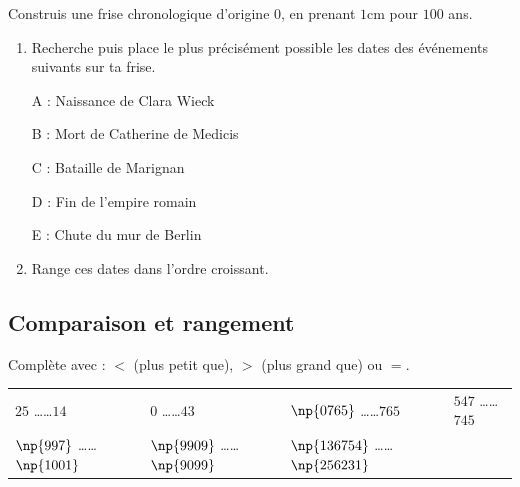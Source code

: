 \documentclass[a4paper,10pt]{report}
\begin{document}
\begin{ex}

\vspace{-2.2mm} \hspace{5cm}Construis une frise chronologique d'origine $0$, en prenant $1$cm pour $100$ ans.
\begin{enumerate}
\item Recherche puis place le plus précisément possible les dates des événements suivants sur ta frise.

A : \og Naissance de Clara Wieck \fg{}

B : \og Mort de Catherine de Medicis \fg{}

C : \og Bataille de Marignan \fg{}

D : \og Fin de l'empire romain \fg{}

E : \og Chute du mur de Berlin \fg{}

\item Range ces dates dans l'ordre croissant.
\end{enumerate}
\end{ex}

\subsection*{Comparaison et rangement}

\begin{ex}
Complète avec : $<$ (plus petit que), $>$ (plus grand que) ou $=$.

\begin{enumerate}
\begin{tabular}{m{4cm}m{4cm}m{4cm}m{4cm}}
\item $25$ \dots\dots  $14$&
\item $0$ \dots\dots  $43$&
\item $\np{0765}$ \dots\dots  $765$&
\item $547$ \dots\dots  $745$\\
\item $\np{997}$ \dots\dots  $\np{1 001}$&
\item $\np{9 909}$ \dots\dots  $\np{9 099}$&
\item $\np{136754}$ \dots\dots  $\np{256231}$&\\
\end{tabular}
\end{enumerate}
\end{ex}
\end{document}
